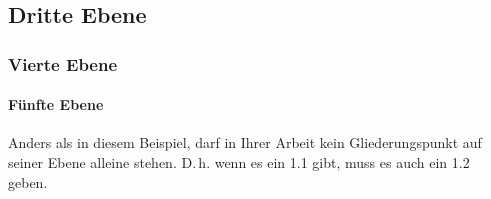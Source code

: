 \subsection{Dritte Ebene}

\label{Gliederung:EbeneDrei}


\subsubsection{Vierte Ebene}

\paragraph{Fünfte Ebene} Anders als in diesem Beispiel, darf in Ihrer Arbeit kein Gliederungspunkt auf seiner Ebene alleine stehen. D.\,h. wenn es ein 1.1 gibt, muss es auch ein 1.2 geben.
